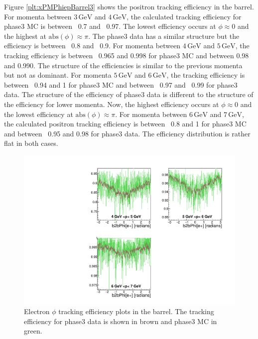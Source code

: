 \documentclass[a4paper,11pt,twosided,final,german,openbib,pdftex,listof=totoc,bibliography=totoc]{scrbook}
\begin{document}
Figure \ref{plt:xPMPhiepBarrel3} shows the positron tracking efficiency in the barrel. 
For momenta between $3\,\textrm{GeV}$ and $4\,\textrm{GeV}$, the calculated tracking efficiency for phase3 MC is between ~0.7 and ~0.97. The lowest efficiency  occurs at $\phi \approx 0$ and the highest at $\textrm{abs}(\phi) \approx \pi$. The phase3 data has a similar structure but the efficiency is between ~0.8 and ~0.9.
For momenta between $4\,\textrm{GeV}$ and $5\,\textrm{GeV}$, the tracking efficiency is between ~0.965 and 0.998 for phase3 MC and between 0.98 and 0.990. The structure of the efficiencies is similar to the previous momenta but not as dominant.
For momenta $5\,\textrm{GeV}$ and $6\,\textrm{GeV}$, the tracking efficiency is between ~0.94 and 1 for phase3 MC and between ~0.97 and ~0.99 for phase3 data. The structure of the efficiency of phase3 data is different to the structure of the efficiency for lower momenta. Now, the highest efficiency occurs at $\phi \approx 0$ and the lowest efficiency at $\textrm{abs}{(\phi)} \approx \pi$.
For momenta between $6\,\textrm{GeV}$ and $7\,\textrm{GeV}$, the calculated positron tracking efficiency is  between ~0.8 and 1 for phase3 MC and between ~0.95 and 0.98 for phase3 data. The efficiency distribution is rather flat in both cases.

\begin{figure}[!htbp]
	\centering
	\includegraphics[width=\textwidth]{Plots/master3/xPMPhiemBarrelP3}
	\caption[Momentum $\phi$ Electron Barrel Efficiency Phase3]{Electron $\phi$ tracking efficiency plots in the barrel. The tracking efficiency for phase3 data is shown in brown and phase3 MC in green.}
	\label{plt:xPMPhiemBarrel3}
\end{figure}
\end{document}
